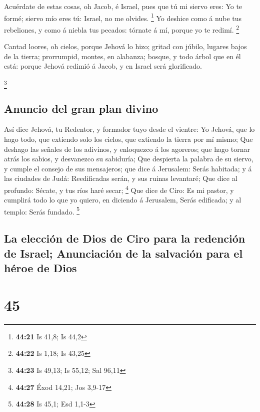  Acuérdate de estas cosas, oh Jacob, é Israel, pues que
tú mi siervo eres: Yo te formé; siervo mío eres tú: Israel, no me
olvides. \footnote{\textbf{44:21} Is 41,8; Is 44,2}  Yo
deshice como á nube tus rebeliones, y como á niebla tus pecados: tórnate
á mí, porque yo te redimí. \footnote{\textbf{44:22} Is 1,18; Is 43,25}

 Cantad loores, oh cielos, porque Jehová lo hizo; gritad
con júbilo, lugares bajos de la tierra; prorrumpid, montes, en alabanza;
bosque, y todo árbol que en él está: porque Jehová redimió á Jacob, y en
Israel será glorificado.

\footnote{\textbf{44:23} Is 49,13; Is 55,12; Sal 96,11}

\hypertarget{anuncio-del-gran-plan-divino}{%
\subsection{Anuncio del gran plan
divino}\label{anuncio-del-gran-plan-divino}}

 Así dice Jehová, tu Redentor, y formador tuyo desde el
vientre: Yo Jehová, que lo hago todo, que extiendo solo los cielos, que
extiendo la tierra por mí mismo;  Que deshago las señales
de los adivinos, y enloquezco á los agoreros; que hago tornar atrás los
sabios, y desvanezco su sabiduría;  Que despierta la
palabra de su siervo, y cumple el consejo de sus mensajeros; que dice á
Jerusalem: Serás habitada; y á las ciudades de Judá: Reedificadas serán,
y sus ruinas levantaré;  Que dice al profundo: Sécate, y
tus ríos haré secar; \footnote{\textbf{44:27} Éxod 14,21; Jos 3,9-17}
 Que dice de Ciro: Es mi pastor, y cumplirá todo lo que
yo quiero, en diciendo á Jerusalem, Serás edificada; y al templo: Serás
fundado. \footnote{\textbf{44:28} Is 45,1; Esd 1,1-3}

\hypertarget{la-elecciuxf3n-de-dios-de-ciro-para-la-redenciuxf3n-de-israel-anunciaciuxf3n-de-la-salvaciuxf3n-para-el-huxe9roe-de-dios}{%
\subsection{La elección de Dios de Ciro para la redención de Israel;
Anunciación de la salvación para el héroe de
Dios}\label{la-elecciuxf3n-de-dios-de-ciro-para-la-redenciuxf3n-de-israel-anunciaciuxf3n-de-la-salvaciuxf3n-para-el-huxe9roe-de-dios}}

\hypertarget{section-44}{%
\section{45}\label{section-44}}

